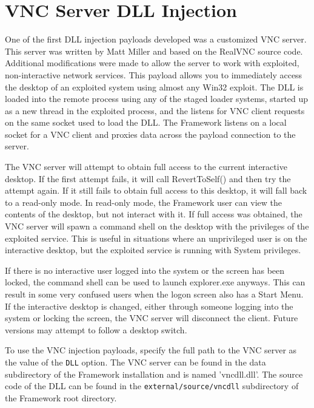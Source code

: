 \documentclass{report}
\begin{document}
\section{VNC Server DLL Injection}

\par
One of the first DLL injection payloads developed was a customized VNC server.
This server was written by Matt Miller and based on the RealVNC source code.
Additional modifications were made to allow the server to work with exploited,
non-interactive network services. This payload allows you to immediately access
the desktop of an exploited system using almost any Win32 exploit. The DLL is
loaded into the remote process using any of the staged loader systems, started
up as a new thread in the exploited process, and the listens for VNC client
requests on the same socket used to load the DLL. The Framework listens on a
local socket for a VNC client and proxies data across the payload connection to
the server.

\par
The VNC server will attempt to obtain full access to the current interactive
desktop. If the first attempt fails, it will call RevertToSelf() and then try
the attempt again. If it still fails to obtain full access to this desktop, it
will fall back to a read-only mode. In read-only mode, the Framework user can
view the contents of the desktop, but not interact with it. If full access was
obtained, the VNC server will spawn a command shell on the desktop with the
privileges of the exploited service. This is useful in situations where an
unprivileged user is on the interactive desktop, but the exploited service is
running with System privileges.

\par
If there is no interactive user logged into the system or the screen has been
locked, the command shell can be used to launch explorer.exe anyways. This can
result in some very confused users when the logon screen also has a Start Menu.
If the interactive desktop is changed, either through someone logging into the
system or locking the screen, the VNC server will disconnect the client. Future
versions may attempt to follow a desktop switch.

\par
To use the VNC injection payloads, specify the full path to the VNC server as
the value of the \texttt{DLL} option. The VNC server can be found in the data
subdirectory of the Framework installation and is named 'vncdll.dll'. The source
code of the DLL can be found in the \texttt{external/source/vncdll} subdirectory
of the Framework root directory.
\end{document}
